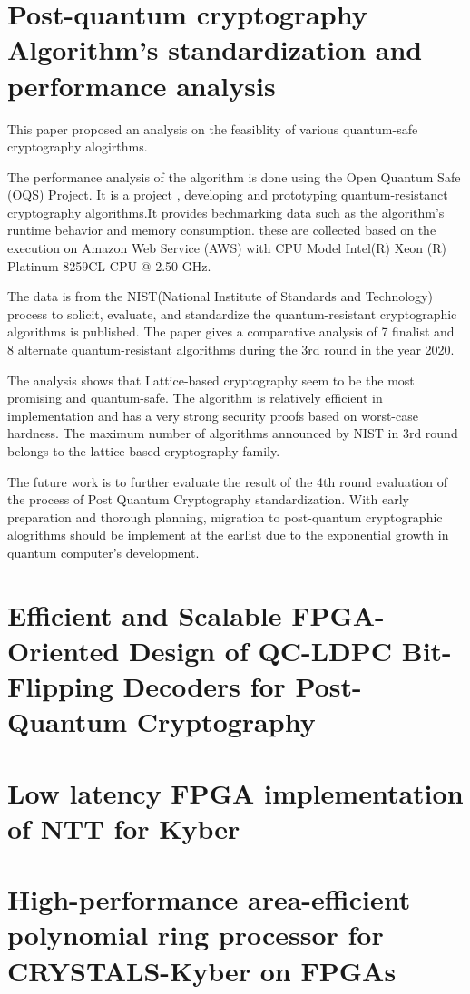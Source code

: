 \documentclass[a4paper, 12pt]{report}
\begin{document}
	\section{Post-quantum cryptography Algorithm's standardization and performance analysis \cite{paper_3}}
	
	This paper proposed an analysis on the feasiblity of various quantum-safe cryptography alogirthms.
	
	The performance analysis of the algorithm is done using the Open Quantum Safe (OQS) Project. It is a project , developing and prototyping quantum-resistanct cryptography algorithms.It provides bechmarking data such as the algorithm's runtime behavior and memory consumption. these are collected based on the execution on Amazon Web Service (AWS) with CPU Model Intel(R) Xeon (R) Platinum 8259CL CPU @ 2.50 GHz.
	
	The data is from the NIST(National Institute of Standards and Technology) process to solicit, evaluate, and standardize the quantum-resistant cryptographic algorithms is published. The paper gives a comparative analysis of 7 finalist and 8 alternate quantum-resistant algorithms during the 3rd round in the year 2020.
	
	The analysis shows that Lattice-based cryptography seem to be the most promising and quantum-safe. The algorithm is relatively efficient in implementation and has a very strong security proofs based on worst-case hardness. The maximum number of algorithms announced by NIST in 3rd round belongs to the lattice-based cryptography family.
	
	The future work is to further evaluate the result of the 4th round evaluation of the process of Post Quantum Cryptography standardization. With early preparation and thorough planning, migration to post-quantum cryptographic alogrithms should be implement at the earlist due to the exponential growth in quantum computer's development.
	\section{Efficient and Scalable FPGA-Oriented Design of QC-LDPC Bit-Flipping Decoders for Post-Quantum Cryptography \cite{paper_4}}
	\section{Low latency FPGA implementation of NTT for Kyber \cite{paper_5}}
	\section{High-performance area-efficient polynomial ring processor for CRYSTALS-Kyber on FPGAs \cite{paper_6}}
	\newpage
	
	
\end{document}
